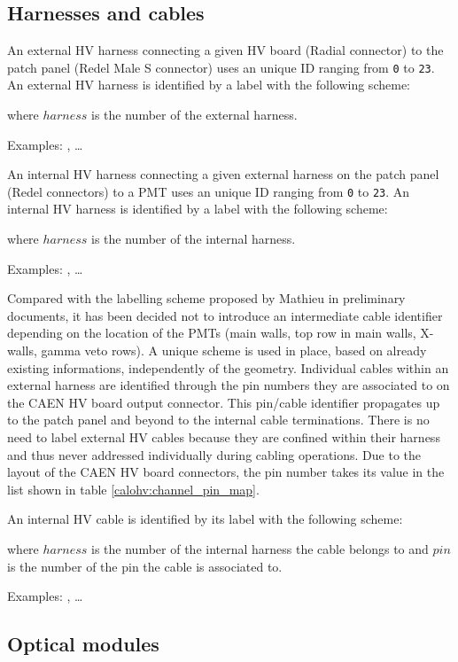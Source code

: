 \subsection{Harnesses and cables}

\vskip 10pt An external HV harness connecting a given HV board (Radial
connector) to the patch panel (Redel  Male S connector) uses an unique
ID ranging from  \texttt{0} to \texttt{23}.  An external  HV harness is
identified by a label with the following scheme:
\begin{center}
 \end{center}
where \texttt{$harness$} is the number of the external harness.
\par\noindent Examples: , \dots
{}

\vskip 10pt An internal HV harness connecting a given external harness
on  the patch  panel (Redel  connectors) to  a PMT  uses an  unique ID
ranging from  \texttt{0} to  \texttt{23}.  An  internal HV  harness is
identified by a label with the following scheme:
\begin{center}
 \end{center}
where  \texttt{$harness$}  is  the  number of  the  internal  harness.
\par\noindent        Examples:       ,        \dots
{}

\vskip 10pt Compared with the  labelling scheme proposed by Mathieu in
preliminary  documents,  it  has  been decided  not  to  introduce  an
intermediate cable  identifier depending on  the location of  the PMTs
(main walls,  top row  in main  walls, X-walls,  gamma veto  rows).  A
unique  scheme   is  used   in  place,   based  on   already  existing
informations, independently of the geometry.  Individual cables within
an external  harness are identified  through the pin numbers  they are
associated to on  the CAEN HV board output  connector.  This pin/cable
identifier propagates up to the patch panel and beyond to the internal
cable  terminations.  There  is no  need to  label external  HV cables
because  they  are  confined  within  their  harness  and  thus  never
addressed individually  during cabling operations.  Due  to the layout
of the CAEN HV board connectors, the pin number takes its value in the
list shown in table \ref{calohv:channel_pin_map}.

\vskip 10pt An  internal HV cable is identified by its label with the
following scheme:
\begin{center}
 \end{center}
where \texttt{$harness$}  is the  number of  the internal  harness the
cable belongs to and \texttt{$pin$} is the number of the pin the cable
is  associated  to.   \par\noindent  Examples:  ,
\dots {}

\subsection{Optical modules}



